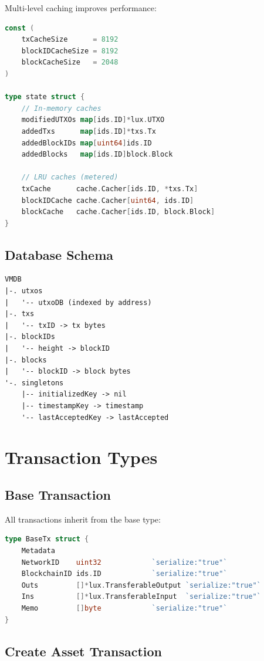 \documentclass[11pt,a4paper]{article}
\begin{document}
Multi-level caching improves performance:

\begin{lstlisting}[language=Go,caption={Cache Configuration}]
const (
    txCacheSize      = 8192
    blockIDCacheSize = 8192
    blockCacheSize   = 2048
)

type state struct {
    // In-memory caches
    modifiedUTXOs map[ids.ID]*lux.UTXO
    addedTxs      map[ids.ID]*txs.Tx
    addedBlockIDs map[uint64]ids.ID
    addedBlocks   map[ids.ID]block.Block

    // LRU caches (metered)
    txCache      cache.Cacher[ids.ID, *txs.Tx]
    blockIDCache cache.Cacher[uint64, ids.ID]
    blockCache   cache.Cacher[ids.ID, block.Block]
}
\end{lstlisting}

\subsection{Database Schema}

\begin{verbatim}
VMDB
|-. utxos
|   '-- utxoDB (indexed by address)
|-. txs
|   '-- txID -> tx bytes
|-. blockIDs
|   '-- height -> blockID
|-. blocks
|   '-- blockID -> block bytes
'-. singletons
    |-- initializedKey -> nil
    |-- timestampKey -> timestamp
    '-- lastAcceptedKey -> lastAccepted
\end{verbatim}

\section{Transaction Types}

\subsection{Base Transaction}

All transactions inherit from the base type:

\begin{lstlisting}[language=Go,caption={Base Transaction}]
type BaseTx struct {
    Metadata
    NetworkID    uint32            `serialize:"true"`
    BlockchainID ids.ID            `serialize:"true"`
    Outs         []*lux.TransferableOutput `serialize:"true"`
    Ins          []*lux.TransferableInput  `serialize:"true"`
    Memo         []byte            `serialize:"true"`
}
\end{lstlisting}

\subsection{Create Asset Transaction}
\end{document}

